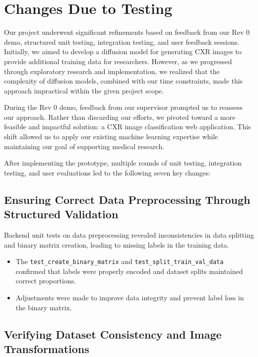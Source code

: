 \documentclass[12pt, titlepage]{article}
\begin{document}
\section{Changes Due to Testing}

Our project underwent significant refinements based on feedback from our Rev 0 demo, structured unit testing, integration testing, and user feedback sessions. Initially, we aimed to develop a diffusion model for generating CXR images to provide additional training data for researchers. However, as we progressed through exploratory research and implementation, we realized that the complexity of diffusion models, combined with our time constraints, made this approach impractical within the given project scope.

During the Rev 0 demo, feedback from our supervisor prompted us to reassess our approach. Rather than discarding our efforts, we pivoted toward a more feasible and impactful solution: a CXR image classification web application. This shift allowed us to apply our existing machine learning expertise while maintaining our goal of supporting medical research.

After implementing the prototype, multiple rounds of unit testing, integration testing, and user evaluations led to the following seven key changes:

\subsection{Ensuring Correct Data Preprocessing Through Structured Validation}

Backend unit tests on data preprocessing revealed inconsistencies in data splitting and binary matrix creation, leading to missing labels in the training data.
\begin{itemize}
    \item The \texttt{test\_create\_binary\_matrix} and \texttt{test\_split\_train\_val\_data} confirmed that labels were properly encoded and dataset splits maintained correct proportions.
    \item Adjustments were made to improve data integrity and prevent label loss in the binary matrix.
\end{itemize}

\subsection{Verifying Dataset Consistency and Image Transformations}
\end{document}
